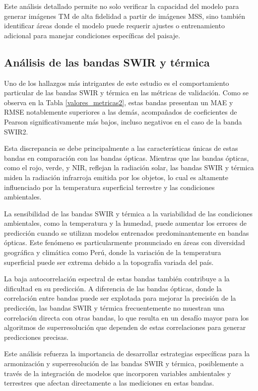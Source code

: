             Este análisis detallado permite no solo verificar la capacidad del modelo para generar imágenes TM de alta fidelidad a partir de imágenes MSS, sino también identificar áreas donde el modelo puede requerir ajustes o entrenamiento adicional para manejar condiciones específicas del paisaje.


        \subsection{Análisis de las bandas SWIR y térmica}

            Uno de los hallazgos más intrigantes de este estudio es el comportamiento particular de las bandas SWIR y térmica en las métricas de validación. Como se observa en la Tabla \ref{valores_metricas2}, estas bandas presentan un MAE y RMSE notablemente superiores a las demás, acompañados de coeficientes de Pearson significativamente más bajos, incluso negativos en el caso de la banda SWIR2. 

            Esta discrepancia se debe principalmente a las características únicas de estas bandas en comparación con las bandas ópticas. Mientras que las bandas ópticas, como el rojo, verde, y NIR, reflejan la radiación solar, las bandas SWIR y térmica miden la radiación infrarroja emitida por los objetos, lo cual es altamente influenciado por la temperatura superficial terrestre y las condiciones ambientales.

            La sensibilidad de las bandas SWIR y térmica a la variabilidad de las condiciones ambientales, como la temperatura y la humedad, puede aumentar los errores de predicción cuando se utilizan modelos entrenados predominantemente en bandas ópticas. Este fenómeno es particularmente pronunciado en áreas con diversidad geográfica y climática como Perú, donde la variación de la temperatura superficial puede ser extrema debido a la topografía variada del país.

            La baja autocorrelación espectral de estas bandas también contribuye a la dificultad en su predicción. A diferencia de las bandas ópticas, donde la correlación entre bandas puede ser explotada para mejorar la precisión de la predicción, las bandas SWIR y térmica frecuentemente no muestran una correlación directa con otras bandas, lo que resulta en un desafío mayor para los algoritmos de superresolución que dependen de estas correlaciones para generar predicciones precisas.

            Este análisis refuerza la importancia de desarrollar estrategias específicas para la armonización y superresolución de las bandas SWIR y térmica, posiblemente a través de la integración de modelos que incorporen variables ambientales y terrestres que afectan directamente a las mediciones en estas bandas.


